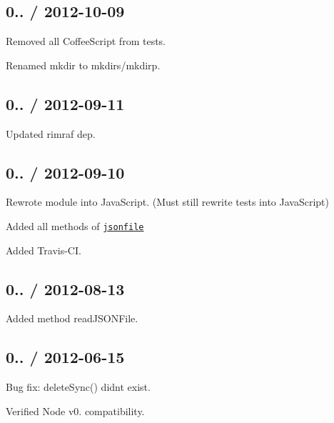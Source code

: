 \subsection*{0.. / 2012-\/10-\/09 }


\begin{DoxyItemize}
\item Removed all Coffee\+Script from tests.
\item Renamed {\ttfamily mkdir} to {\ttfamily mkdirs}/{\ttfamily mkdirp}.
\end{DoxyItemize}

\subsection*{0.. / 2012-\/09-\/11 }


\begin{DoxyItemize}
\item Updated {\ttfamily rimraf} dep.
\end{DoxyItemize}

\subsection*{0.. / 2012-\/09-\/10 }


\begin{DoxyItemize}
\item Rewrote module into Java\+Script. (Must still rewrite tests into Java\+Script)
\item Added all methods of \href{https://github.com/jprichardson/node-jsonfile}{\tt jsonfile}
\item Added Travis-\/\+CI.
\end{DoxyItemize}

\subsection*{0.. / 2012-\/08-\/13 }


\begin{DoxyItemize}
\item Added method {\ttfamily read\+J\+S\+O\+N\+File}.
\end{DoxyItemize}

\subsection*{0.. / 2012-\/06-\/15 }


\begin{DoxyItemize}
\item Bug fix\+: {\ttfamily delete\+Sync()} didn\textquotesingle{}t exist.
\item Verified Node v0. compatibility.
\end{DoxyItemize}

